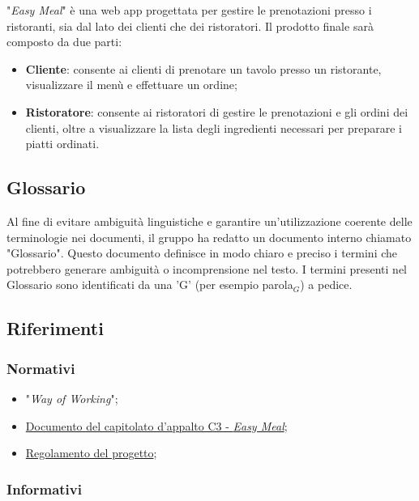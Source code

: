 "\textit{Easy Meal}" è una web app progettata per gestire le prenotazioni
presso i ristoranti, sia dal lato dei clienti che dei ristoratori. Il prodotto
finale sarà composto da due parti:

\begin{itemize}
	\item \textbf{Cliente}: consente ai clienti di prenotare un tavolo presso un
	      ristorante, visualizzare il menù e effettuare un ordine;

	\item \textbf{Ristoratore}: consente ai ristoratori di gestire le
	      prenotazioni e gli ordini dei clienti, oltre a visualizzare la lista
	      degli ingredienti necessari per preparare i piatti ordinati.
\end{itemize}

\subsection{Glossario}

Al fine di evitare ambiguità linguistiche e garantire un'utilizzazione coerente
delle terminologie nei documenti, il gruppo ha redatto un documento interno
chiamato "Glossario". Questo documento definisce in modo chiaro e preciso i
termini che potrebbero generare ambiguità o incomprensione nel testo. I termini
presenti nel Glossario sono identificati da una 'G' (per esempio parola$_G$) a
pedice.

\subsection{Riferimenti}

\subsubsection{Normativi}
\begin{itemize}
	\item "\textit{Way of Working}";
	\item 	\href{https://www.math.unipd.it/~tullio/IS-1/2023/Progetto/C3.pdf}
	      {Documento del capitolato d'appalto C3 - \textit{Easy Meal}};
	\item \href{https://www.math.unipd.it/~tullio/IS-1/2023/Dispense/PD2.pdf}
	      {Regolamento del progetto};
\end{itemize}

\subsubsection{Informativi}

